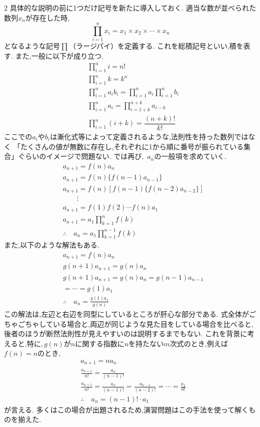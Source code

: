 \documentclass[dvipdfmx,a4paper,11pt,fleqn,openany]{jsbook}
\begin{document}
\begin{multicols*}{2}
      具体的な説明の前に1つだけ記号を新たに導入しておく.
      適当な数が並べられた数列$x_n$が存在した時,
      \[
        \prod_{i=1}^n x_i
        =x_1\times x_2\times\cdots\times x_n
      \]
      となるような記号$\prod$（ラージパイ）を定義する.
      これを総積記号といい,積を表す.
      また,一般に以下が成り立つ.
      \begin{align*}
        &\prod_{i=1}^{n}i=n!\\
        &\prod_{i=1}^{n}k=k^n\\
        &\prod_{i=1}^{n}a_ib_i=\displaystyle\prod_{i=1}^na_i\displaystyle\prod_{i=1}^nb_i\\
        &\prod_{i=1}^{n}a_i=\displaystyle\prod_{i=1+k}^{n+k}a_{i-k}\\
        &\prod_{i=1}^{n}(i+k)=\dfrac{(n+k)!}{k!}
      \end{align*}
      ここでの$a_i$や$b_i$は漸化式等によって定義されるような,法則性を持った数列ではなく
      「たくさんの値が無数に存在し,それぞれに1から順に番号が振られている集合」ぐらいのイメージで問題ない.
      では再び, \,$a_n$の一般項を求めていく.
      \begin{align*}
        &a_{n+1}=f(n)a_n\\
        &a_{n+1}=f(n)\{f(n-1)a_{n-1}\}\\
        &a_{n+1}=f(n)\left[f(n-1)\{f(n-2)a_{n-2}\}\right]\\
        &\qquad \vdots\\
        &a_{n+1}=f(1)f(2) \cdots f(n)a_1\\
        &a_{n+1}=a_1 \prod_{k=1}^n f(k)\\
        &\therefore \quad a_n=a_1 \prod_{k=1}^{n-1} f(k)
      \end{align*}
      また,以下のような解法もある.
      \begin{align*}
        &a_{n+1}=f(n)a_n\\
        &g(n+1)a_{n+1}=g(n)a_n\\
        &g(n+1)a_{n+1}=g(n)a_n=g(n-1)a_{n-1}\\
        &=\cdots=g(1)a_1\\
        &\therefore \quad a_n=\frac{g(1)a_1}{g(n)}
      \end{align*}
      この解法は,左辺と右辺を同型にしているところが肝心な部分である.
      式全体がごちゃごちゃしている場合と,両辺が同じような見た目をしている場合を比べると,後者のほうが断然法則性が見えやすいのは説明するまでもない.
      これを背景に考えると,特に,\,$g(n)$が$n$に関する指数に$n$を持たない$m$次式のとき,例えば$f(n)=n$のとき,
      \begin{align*}
        &a_{n+1}=na_n\\
        &\frac{a_{n+1}}{n!}=\frac{a_n}{(n-1)!}\\
        &\frac{a_{n+1}}{n!}=\frac{a_n}{(n-1)!}=\frac{a_{n-1}}{(n-2)!}=\cdots=\frac{a_1}{0!}\\
        &\therefore \quad a_n=(n-1)!\cdot a_1
      \end{align*}
      が言える.
      多くはこの場合が出題されるため,演習問題はこの手法を使って解くものを揃えた.
      

\end{multicols*}
\end{document}
